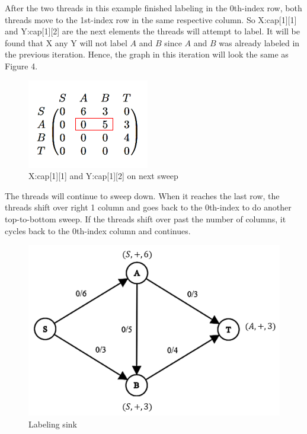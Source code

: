         After the two threads in this example finished labeling in the 0th-index row, both threads move to the 1st-index row in the same respective column. So X:cap[1][1] and Y:cap[1][2] are the next elements the threads will attempt to label. It will be found that X any Y will not label $A$ and $B$ since $A$ and $B$ was already labeled in the previous iteration.
        Hence, the graph in this iteration will look the same as Figure 4.
        
        \begin{figure}[H]
            \centering
            \includegraphics[scale=.7]{figures/Sweep2.png}
            \caption{X:cap[1][1] and Y:cap[1][2] on next sweep}
            \label{fig:Sweep}
        \end{figure}
        
        The threads will continue to sweep down. When it reaches the last row, the threads shift over right 1 column and goes back to the 0th-index to do another top-to-bottom sweep. If the threads shift over past the number of columns, it cycles back to the 0th-index column and continues.

        \begin{figure}[H]
            \centering
            \includegraphics[scale=.6]{figures/hitsink.png}
            \caption{Labeling sink}
            \label{fig:Sweep}
        \end{figure}
        
